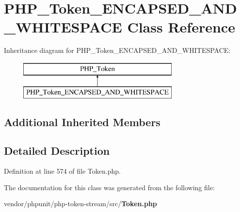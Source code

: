\section{P\+H\+P\+\_\+\+Token\+\_\+\+E\+N\+C\+A\+P\+S\+E\+D\+\_\+\+A\+N\+D\+\_\+\+W\+H\+I\+T\+E\+S\+P\+A\+C\+E Class Reference}
\label{class_p_h_p___token___e_n_c_a_p_s_e_d___a_n_d___w_h_i_t_e_s_p_a_c_e}
Inheritance diagram for P\+H\+P\+\_\+\+Token\+\_\+\+E\+N\+C\+A\+P\+S\+E\+D\+\_\+\+A\+N\+D\+\_\+\+W\+H\+I\+T\+E\+S\+P\+A\+C\+E\+:\begin{figure}[H]
\begin{center}
\leavevmode
\includegraphics[height=2.000000cm]{class_p_h_p___token___e_n_c_a_p_s_e_d___a_n_d___w_h_i_t_e_s_p_a_c_e}
\end{center}
\end{figure}
\subsection*{Additional Inherited Members}


\subsection{Detailed Description}


Definition at line 574 of file Token.\+php.



The documentation for this class was generated from the following file\+:\begin{DoxyCompactItemize}
\item 
vendor/phpunit/php-\/token-\/stream/src/{\bf Token.\+php}\end{DoxyCompactItemize}
